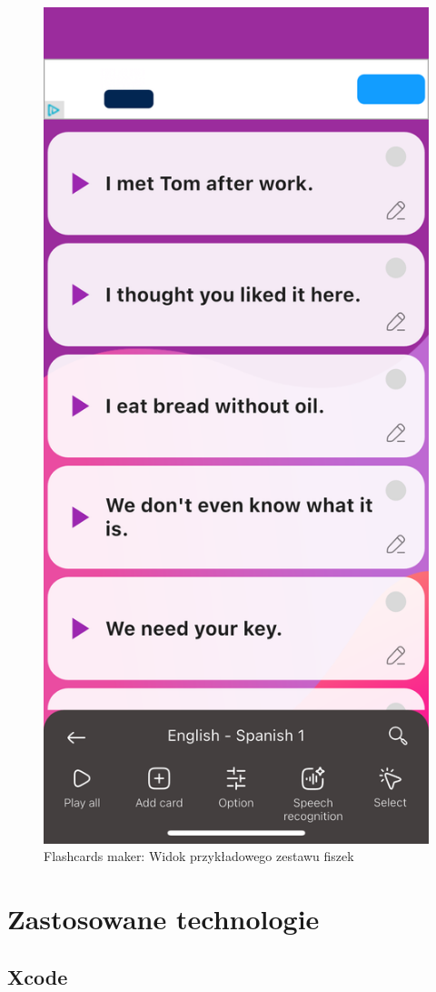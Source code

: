 \documentclass[final,a4paper,openany,12pt]{mwbk}
\begin{document}
\begin{figure}[H]
\begin{minipage}{0.5\textwidth}
  \includegraphics[width=.75\linewidth]{img/flashcards_maker2.PNG}
  \caption{Flashcards maker: Widok przykładowego zestawu fiszek}
  \label{fig:flashcards_maker2}
\end{minipage}
\end{figure}

\chapter{Zastosowane technologie}

\section{Xcode}
\end{document}
